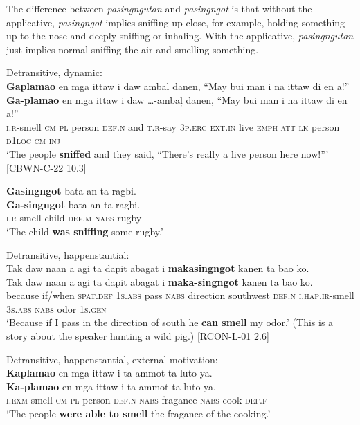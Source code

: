The difference between \textit{pasingngutan} and \textit{pasingngot} is that without the applicative, \textit{pasingngot} implies sniffing up close, for example, holding something up to the nose and deeply sniffing or inhaling. With the applicative, \textit{pasingngutan} just implies normal sniffing the air and smelling something.

\ea
Detransitive, dynamic: \\
\textbf{Gaplamao}  en  mga  ittaw  i  daw  ambaļ  danen,  “May bui  man  i  na  ittaw  di  en  a!” \\\smallskip
\gll \textbf{Ga-plamao}  en  mga  ittaw  i  daw   …-ambaļ  danen,  “May bui  man  i  na  ittaw  di  en  a!” \\
\textsc{i.r}-smell  \textsc{cm}  \textsc{pl}  person  \textsc{def.n}  and  \textsc{t.r}-say  3\textsc{p.erg}  \textsc{ext.in}
live  \textsc{emph}  \textsc{att}  \textsc{lk}  person  \textsc{d1loc}  \textsc{cm}  \textsc{inj} \\
\glt `The people \textbf{sniffed} and they said, “There’s really a live person here now!”’ [CBWN-C-22 10.3]
\z

\ea
\textbf{Gasingngot}  bata  an  ta  ragbi. \\\smallskip
\gll \textbf{Ga-singngot}  bata  an  ta  ragbi. \\
\textsc{i.r}-smell  child  \textsc{def.m}  \textsc{nabs}  rugby \\
\glt ‘The child \textbf{was sniffing} some rugby.’
\z

\ea
Detransitive, happenstantial: \\
Tak  daw  naan  a  agi  ta  dapit  abagat  i \textbf{makasingngot}  kanen  ta  bao  ko. \\\smallskip
\gll Tak  daw  naan  a  agi  ta  dapit  abagat  i \textbf{maka-singngot}  kanen  ta  bao  ko. \\
because  if/when  \textsc{spat.def}  1\textsc{s.abs}  pass  \textsc{nabs}  direction  southwest  \textsc{def.n}
\textsc{i.hap.ir}-smell  3\textsc{s.abs}  \textsc{nabs}  odor  1\textsc{s.gen} \\
\glt `Because if I pass in the direction of south he \textbf{can smell} my odor.’ (This is a story about the speaker hunting a wild pig.) [RCON-L-01 2.6]
\z

\ea
Detransitive, happenstantial, external motivation: \\
\textbf{Kaplamao}  en  mga  ittaw  i  ta  ammot  ta  luto  ya. \\\smallskip
\gll \textbf{Ka-plamao}  en  mga  ittaw  i  ta  ammot  ta  luto  ya. \\
\textsc{i.exm}-smell  \textsc{cm}  \textsc{pl}  person  \textsc{def.n}  \textsc{nabs}  fragance  \textsc{nabs}  cook  \textsc{def.f} \\
\glt  ‘The people \textbf{were able to smell} the fragance of the cooking.’
\z 

